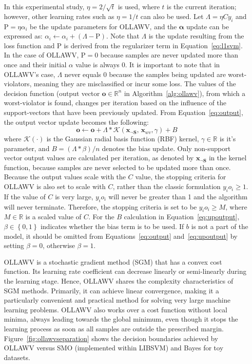 \documentclass[reqno]{vcuthesis}
\newcommand{\set}[1]{{\left\{#1\right\}}}
\newcommand{\reals}{{\mathbb{R}}}
\newcommand{\Rho}{\mathrm{P}}
\numberwithin{equation}{chapter}
\begin{document}
In this experimental study, $\eta = 2/\sqrt{t}$ is used, where $t$ is the current iteration; however, other learning rates such as $\eta = 1/t$ can also be used. Let $\Lambda = \eta Cy_i$ and $\Rho = \eta \alpha_i$ be the update parameters for OLLAWV, and the $\bm \alpha$ update can be expressed as: $\alpha_i \leftarrow \alpha_i + (\Lambda - \Rho)$. Note that $\Lambda$ is the update resulting from the loss function and $\Rho$ is derived from the regularizer term in Equation~\ref{eq:l1svm}. In the case of OLLAWV, $\Rho = 0$ because samples are never updated more than once and their initial $\alpha$ value is always $0$. It is important to note that in OLLAWV's case, $\Lambda$ never equals $0$ because the samples being updated are worst-violators, meaning they are misclassified or incur some loss. The values of the decision function (output vector $\bm o \in \reals^n$ in Algorithm~\ref{alg:ollawv}), from which a worst-violator is found, changes per iteration based on the influence of the support-vectors that have been previously updated. From Equation~\ref{eq:output}, the output vector update becomes the following: 
\begin{equation}
\label{eq:upoutput}
\bm o \leftarrow \bm o + \Lambda*\mathcal{K}\left(\bm{x}_{\neg \bm S},\, \bm{x}_{wv}, \gamma \right) + B
\end{equation}
where $\mathcal{K}(\cdot)$ is the Gaussian radial basis function (RBF) kernel, $\gamma \in \reals$ is it's parameter, and $B = (\Lambda * \beta)/n$ denotes the bias update. Only non-support vector output values are calculated per iteration, as denoted by $\bm x_{\neg \bm S}$ in the kernel function, because samples are never selected to be updated more than once. Because the output values scale with the $C$ value, the stopping criteria for OLLAWV is also set to scale with $C$, rather than the classic formulation $y_i o_i \geq 1$. If the value of $C$ is very large, $y_i o_i$ will never be greater than 1 and the algorithm will never terminate. Therefore, the stopping criteria is set to be $y_i o_i \geq M$, where $M \in \reals$ is a scaled value of $C$. For the $B$ calculation in Equation~\ref{eq:upoutput}, $\beta \in \set{0,1}$ indicates whether the bias term is to be used. If $b$ is not a part of the model, it should be omitted from Equations~\ref{eq:output} and~\ref{eq:upoutput} by setting $\beta = 0$, otherwise $\beta = 1$. 

OLLAWV is a stochastic gradient method (SGM) that has a convex cost function. Its learning rate coefficient can decrease linearly or semi-linearly during the learning stage. Hence, OLLAWV shares the complexity characteristics of SGM methods. Primarily, it can achieve linear convergence, making it a particularly convenient and practical method for solving very large machine learning problems. OLLAWV also works over a cost function without local minima, always leading towards the global minimum, even though it stops the learning process as soon as all samples are outside the prescribed margin. Figure~\ref{fig:ollawvseparation} shows the decision boundaries achieved by OLLAWV versus SMO (implemented within LIBSVM) and Bayes for toy datasets. 
\end{document}
